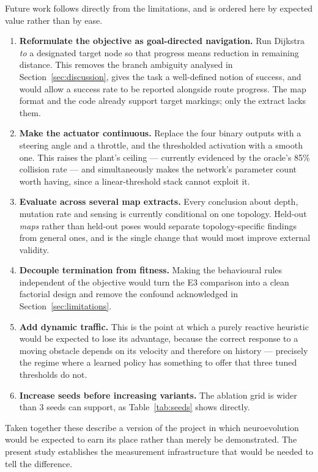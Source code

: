 \documentclass[conference]{IEEEtran}
\begin{document}
Future work follows directly from the limitations, and is ordered here by expected value rather than by ease.

\begin{enumerate}
\item \textbf{Reformulate the objective as goal-directed navigation.} Run Dijkstra \emph{to} a designated target node so that progress means reduction in remaining distance. This removes the branch ambiguity analysed in Section~\ref{sec:discussion}, gives the task a well-defined notion of success, and would allow a success rate to be reported alongside route progress. The map format and the code already support target markings; only the extract lacks them.
\item \textbf{Make the actuator continuous.} Replace the four binary outputs with a steering angle and a throttle, and the thresholded activation with a smooth one. This raises the plant's ceiling — currently evidenced by the oracle's 85\% collision rate — and simultaneously makes the network's parameter count worth having, since a linear-threshold stack cannot exploit it.
\item \textbf{Evaluate across several map extracts.} Every conclusion about depth, mutation rate and sensing is currently conditional on one topology. Held-out \emph{maps} rather than held-out poses would separate topology-specific findings from general ones, and is the single change that would most improve external validity.
\item \textbf{Decouple termination from fitness.} Making the behavioural rules independent of the objective would turn the E3 comparison into a clean factorial design and remove the confound acknowledged in Section~\ref{sec:limitations}.
\item \textbf{Add dynamic traffic.} This is the point at which a purely reactive heuristic would be expected to lose its advantage, because the correct response to a moving obstacle depends on its velocity and therefore on history — precisely the regime where a learned policy has something to offer that three tuned thresholds do not.
\item \textbf{Increase seeds before increasing variants.} The ablation grid is wider than 3 seeds can support, as Table~\ref{tab:seeds} shows directly.
\end{enumerate}

Taken together these describe a version of the project in which neuroevolution would be expected to earn its place rather than merely be demonstrated. The present study establishes the measurement infrastructure that would be needed to tell the difference.
\end{document}
